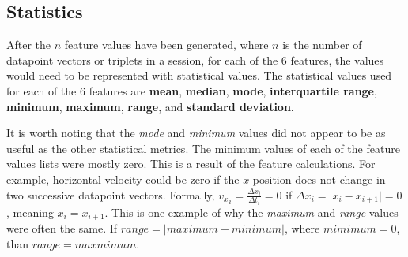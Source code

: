 \subsection{Statistics}\label{subsec:statistics}
After the $n$ feature values have been generated, where $n$ is the number of datapoint vectors or triplets in a session, for each of the 6 features, the values would need to be represented with statistical values.
The statistical values used for each of the 6 features are \textbf{mean}, \textbf{median}, \textbf{mode}, \textbf{interquartile range}, \textbf{minimum}, \textbf{maximum}, \textbf{range}, and \textbf{standard deviation}.

It is worth noting that the \textit{mode} and \textit{minimum} values did not appear to be as useful as the other statistical metrics.
The minimum values of each of the feature values lists were mostly zero.
This is a result of the feature calculations.
For example, horizontal velocity could be zero if the $x$ position does not change in two successive datapoint vectors.
Formally, ${v_x}_i = \frac{\Delta x_i}{\Delta t_i} = 0$ if $\Delta x_i = \lvert x_i - x_{i+1} \rvert = 0$, meaning $x_i = x_{i+1}$.
This is one example of why the \textit{maximum} and \textit{range} values were often the same.
If $range = \vert maximum - minimum \rvert$, where $mimimum = 0$, than $range = maxmimum$.

